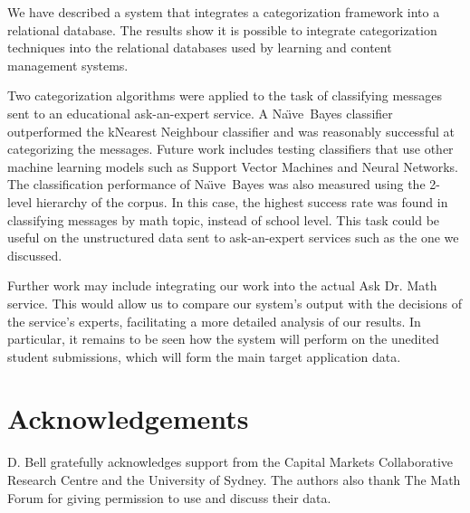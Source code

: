 \documentclass{ios}
\newcommand{\naive}{Na\"\i ve}
\begin{document}
We have described a system that integrates a categorization framework into a 
relational database. The results show it is possible to integrate categorization 
techniques into the relational databases used by learning and content management 
systems.

Two categorization algorithms were applied to the task of classifying
messages sent to an educational ask-an-expert service.  A \naive\
Bayes classifier outperformed the k\-Nearest Neighbour classifier and
was reasonably successful at categorizing the messages. Future work
includes testing classifiers that use other machine learning models
such as Support Vector Machines and Neural Networks.  The
classification performance of \naive\ Bayes was also measured using the
2-level hierarchy of the corpus. In this case, the highest success
rate was found in classifying messages by math topic, instead of
school level. This task could be useful on the unstructured data sent
to ask-an-expert services such as the one we discussed.

Further work may include integrating our work into the actual Ask
Dr. Math service.  This would allow us to compare our system's output
with the decisions of the service's experts, facilitating a more
detailed analysis of our results.  In particular, it remains to be
seen how the system will perform on the unedited student submissions,
which will form the main target application data.

\section*{Acknowledgements}

D. Bell gratefully acknowledges support from the Capital Markets 
Collaborative Research Centre and the University of Sydney. The authors also 
thank The Math Forum for giving permission to use and discuss their data. 



\end{document}

